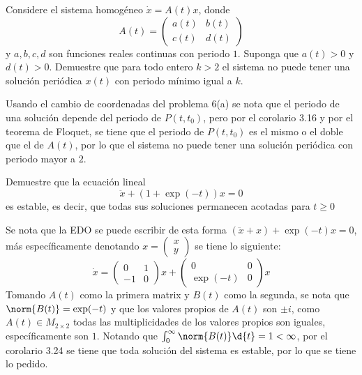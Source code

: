 \documentclass{homework}
\begin{document}
\begin{sol}
    
\end{sol}

\begin{prob}
    Considere el sistema homogéneo \(\dot{x}=A(t)x\), donde
    \[A(t)=\begin{pmatrix}
        a(t)&b(t)\\c(t)&d(t)
    \end{pmatrix}\]
    y \(a,b,c,d\) son funciones reales continuas con periodo \(1\). Suponga que \(a(t)>0\) y \(d(t)>0\). Demuestre que para todo entero \(k>2\) el sistema no puede tener una solución periódica \(x(t)\) con periodo mínimo igual a \(k\).
\end{prob}

\begin{sol}
    Usando el cambio de coordenadas del problema 6(a) se nota que el periodo de una solución depende del periodo de \(P(t,t_0)\), pero por el corolario 3.16 y por el teorema de Floquet, se tiene que el periodo de \(P(t,t_0)\) es el mismo o el doble que el de \(A(t)\), por lo que el sistema no puede tener una solución periódica con periodo mayor a \(2\).
\end{sol}

\begin{prob}
    Demuestre que la ecuación lineal
    \[\ddot{x}+(1+\exp(-t))x=0\]
    es estable, es decir, que todas sus soluciones permanecen acotadas para \(t\geq0\)
\end{prob}

\begin{sol}
    Se nota que la EDO se puede escribir de esta forma \((\ddot{x}+x)+\exp(-t)x=0\), más específicamente denotando \(x=\begin{pmatrix}
        x\\y
    \end{pmatrix}\) se tiene lo siguiente:
    \begin{equation*}
        \dot{x}=\begin{pmatrix}
            0&1\\-1&0
        \end{pmatrix}x+\begin{pmatrix}
            0&0\\\exp(-t)&0
        \end{pmatrix}x
    \end{equation*}
    Tomando \(A(t)\) como la primera matrix y \(B(t)\) como la segunda, se nota que \(\norm{B(t)}=\exp(-t)\) y que los valores propios de \(A(t)\) son \(\pm i\), como \(A(t)\in M_{2\times 2}\) todas las multiplicidades de los valores propios son iguales, específicamente son \(1\). Notando que \(\int_0^\infty\norm{B(t)}\d{t}=1<\infty\), por el corolario 3.24 se tiene que toda solución del sistema es estable, por lo que se tiene lo pedido.
\end{sol}
\end{document}
